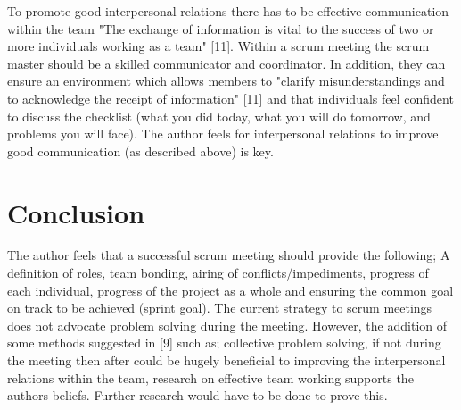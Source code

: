 \documentclass{scrartcl}
\begin{document}
To promote good interpersonal relations there has to be effective communication within the team "The exchange of information is vital to the success of two or more individuals working as a team" [11]. Within a scrum meeting the scrum master should be a skilled communicator and coordinator. In addition, they can ensure an environment which allows members to "clarify misunderstandings and to acknowledge the receipt of information" [11] and that individuals feel confident to discuss the checklist (what you did today, what you will do tomorrow, and problems you will face). The author feels for interpersonal relations to improve good communication (as described above) is key. 


\section{Conclusion}
The author feels that a successful scrum meeting should provide the following; A definition of roles, team bonding, airing of conflicts/impediments, progress of each individual, progress of the project as a whole and ensuring the common goal on track to be achieved (sprint goal).  The current strategy to scrum meetings does not advocate problem solving during the meeting. However, the addition of some methods suggested in [9] such as; collective problem solving, if not during the meeting then after could be hugely beneficial to improving the interpersonal relations within the team, research on effective team working supports the authors beliefs. Further research would have to be done to prove this.



\end{document}
